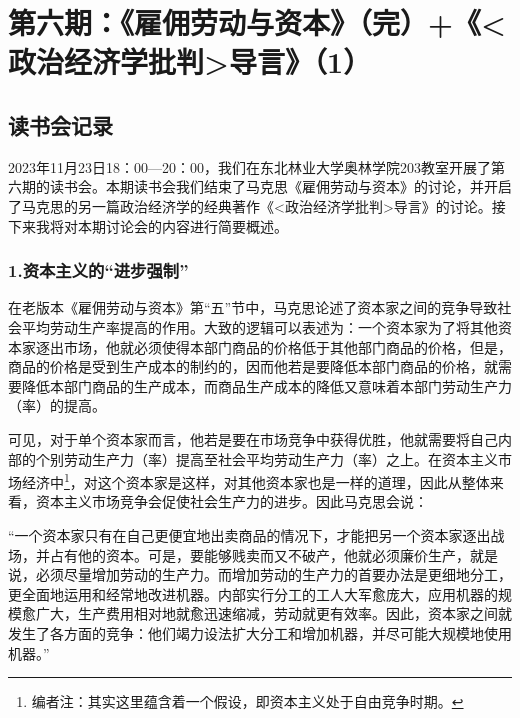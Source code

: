 \documentclass[a4paper,twoside,12pt,AutoFakeBold]{ctexart}
\begin{document}
\newpage
\section{第六期：《雇佣劳动与资本》（完）+《<政治经济学批判>导言》（1）}
\subsection{读书会记录}
2023年11月23日18：00—20：00，我们在东北林业大学奥林学院203教室开展了第六期的读书会。本期读书会我们结束了马克思《雇佣劳动与资本》的讨论，并开启了马克思的另一篇政治经济学的经典著作《<政治经济学批判>导言》的讨论。接下来我将对本期讨论会的内容进行简要概述。

\subsubsection{1.资本主义的“进步强制”}
在老版本《雇佣劳动与资本》第“五”节中，马克思论述了资本家之间的竞争导致社会平均劳动生产率提高的作用。大致的逻辑可以表述为：一个资本家为了将其他资本家逐出市场，他就必须使得本部门商品的价格低于其他部门商品的价格，但是，商品的价格是受到生产成本的制约的，因而他若是要降低本部门商品的价格，就需要降低本部门商品的生产成本，而商品生产成本的降低又意味着本部门劳动生产力（率）的提高。

可见，对于单个资本家而言，他若是要在市场竞争中获得优胜，他就需要将自己内部的个别劳动生产力（率）提高至社会平均劳动生产力（率）之上。在资本主义市场经济中\footnote{编者注：其实这里蕴含着一个假设，即资本主义处于自由竞争时期。}，对这个资本家是这样，对其他资本家也是一样的道理，因此从整体来看，资本主义市场竞争会促使社会生产力的进步。因此马克思会说：
\begin{adjustwidth}{2em}{2em}
    \qquad\fangsong
    “一个资本家只有在自己更便宜地出卖商品的情况下，才能把另一个资本家逐出战场，并占有他的资本。可是，要能够贱卖而又不破产，他就必须廉价生产，就是说，必须尽量增加劳动的生产力。而增加劳动的生产力的首要办法是更细地分工，更全面地运用和经常地改进机器。内部实行分工的工人大军愈庞大，应用机器的规模愈广大，生产费用相对地就愈迅速缩减，劳动就更有效率。因此，资本家之间就发生了各方面的竞争：他们竭力设法扩大分工和增加机器，并尽可能大规模地使用机器。”
\end{adjustwidth}
\end{document}
